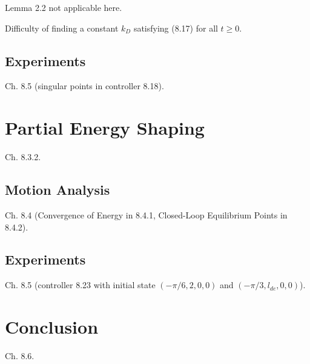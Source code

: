 \documentclass[a4paper]{article}
\begin{document}
Lemma 2.2 not applicable here.

Difficulty of finding a constant $k_D$ satisfying (8.17) for all $t \ge 0$.

\subsection{Experiments}
Ch. 8.5 (singular points in controller 8.18).

\section{Partial Energy Shaping}
Ch. 8.3.2.

\subsection{Motion Analysis}
Ch. 8.4 (Convergence of Energy in 8.4.1, Closed-Loop Equilibrium Points in
8.4.2).

\subsection{Experiments}
Ch. 8.5 (controller 8.23 with initial state $(-\pi/6, 2, 0, 0)$ and
$(-\pi/3, l_{de}, 0, 0)$).

\section{Conclusion}
Ch. 8.6.


\clearpage







\end{document}
